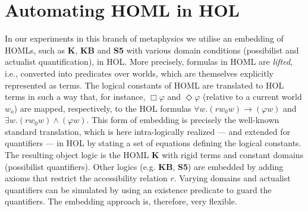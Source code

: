 \documentclass{llncs}
\newcommand{\imp}{{\rightarrow}}
\begin{document}








\section{Automating HOML in HOL}\label{sec:homlinhol}



In our experiments in this branch of metaphysics we
utilise an embedding of HOMLs, such as \textbf{K}, \textbf{KB} and
\textbf{S5} with various domain conditions (possibilist and actualist
quantification), in HOL. More precisely, formulas in HOML are \emph{lifted}, i.e., converted
into predicates over worlds, which are themselves explicitly
represented as terms. The logical constants of HOML are translated to
HOL terms in such a way that, for instance,
$\Box \varphi$ and $\Diamond \varphi$ (relative to a current world
$w_o$) are mapped, respectively, to the HOL formulas
$\forall w. (r w_0 w) \imp (\varphi w)$ and
$\exists w. (r w_0 w) \wedge (\varphi w)$. This form of embedding is
precisely the well-known standard translation,
which is here intra-logically realized --- and extended for
quantifiers --- in HOL by stating a set of equations defining the
logical constants. The resulting object logic is
the HOML \textbf{K} with rigid terms and constant domains (possibilist
quantifiers). Other logics (e.g. \textbf{KB}, \textbf{S5}) are
embedded by adding axioms that restrict the accessibility relation
$r$. Varying domains and actualist quantifiers can be simulated by
using an existence predicate to guard the quantifiers. The embedding
approach is, therefore, very flexible.
\end{document}
